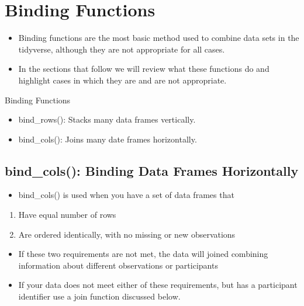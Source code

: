 \documentclass[]{book}
\providecommand{\tightlist}{%
  \setlength{\itemsep}{0pt}\setlength{\parskip}{0pt}}
\theoremstyle{definition}
\theoremstyle{definition}
\theoremstyle{definition}
\theoremstyle{remark}
\begin{document}
\hypertarget{binding-functions}{%
\chapter{Binding Functions}\label{binding-functions}}

\begin{itemize}
\tightlist
\item
  Binding functions are the most basic method used to combine data sets in the tidyverse, although they are not appropriate for all cases.
\item
  In the sections that follow we will review what these functions do and highlight cases in which they are and are not appropriate.
\end{itemize}

Binding Functions

\begin{itemize}
\tightlist
\item
  bind\_rows(): Stacks many data frames vertically.
\item
  bind\_cols(): Joins many date frames horizontally.
\end{itemize}

\hypertarget{bind_cols-binding-data-frames-horizontally}{%
\section{bind\_cols(): Binding Data Frames Horizontally}\label{bind_cols-binding-data-frames-horizontally}}

\begin{itemize}
\tightlist
\item
  bind\_cols() is used when you have a set of data frames that
\end{itemize}

\begin{enumerate}
\def\labelenumi{\arabic{enumi}.}
\tightlist
\item
  Have equal number of rows
\item
  Are ordered identically, with no missing or new observations
\end{enumerate}

\begin{itemize}
\tightlist
\item
  If these two requirements are not met, the data will joined combining information about different observations or participants
\item
  If your data does not meet either of these requirements, but has a participant identifier use a join function discussed below.
\end{itemize}
\end{document}
